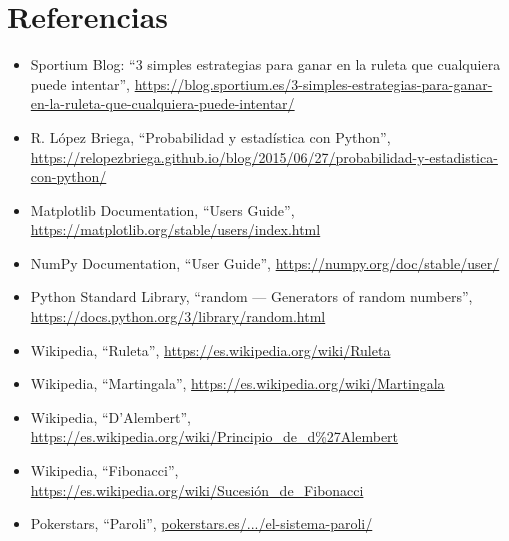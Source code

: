 \documentclass{article}
\begin{document}
\section{Referencias}
\begin{itemize}
  \item Sportium Blog: “3 simples estrategias para ganar en la ruleta que cualquiera puede intentar”, \url{https://blog.sportium.es/3-simples-estrategias-para-ganar-en-la-ruleta-que-cualquiera-puede-intentar/}
  \item R. López Briega, “Probabilidad y estadística con Python”, \url{https://relopezbriega.github.io/blog/2015/06/27/probabilidad-y-estadistica-con-python/}
  \item Matplotlib Documentation, “Users Guide”, \url{https://matplotlib.org/stable/users/index.html}
  \item NumPy Documentation, “User Guide”, \url{https://numpy.org/doc/stable/user/}
  \item Python Standard Library, “random — Generators of random numbers”, \url{https://docs.python.org/3/library/random.html}
  \item Wikipedia, “Ruleta”, \url{https://es.wikipedia.org/wiki/Ruleta}
  \item Wikipedia, “Martingala”, \url{https://es.wikipedia.org/wiki/Martingala}
  \item Wikipedia, “D'Alembert”, \url{https://es.wikipedia.org/wiki/Principio_de_d%27Alembert}
  \item Wikipedia, “Fibonacci”, \url{https://es.wikipedia.org/wiki/Sucesión_de_Fibonacci}
  \item Pokerstars, “Paroli”, \href{https://www.pokerstars.es/casino/news/los-grandes-sistemas-de-la-ruleta-el-sistema-paroli/}{pokerstars.es/.../el-sistema-paroli/}
\end{itemize}
\end{document}
